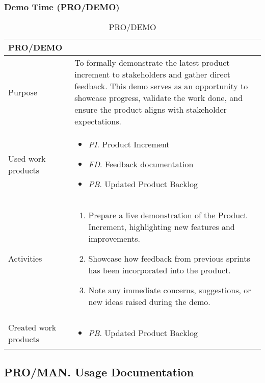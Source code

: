 \subsubsection{Demo Time (PRO/DEMO)}
\begin{table}[h!]
\begin{tabular}{l|p{}}
\hline
\textbf{PRO/DEMO}        & \textbf{} \\ \hline
Purpose & To formally demonstrate the latest product increment to stakeholders and gather direct feedback. This demo serves as an opportunity to showcase progress, validate the work done, and ensure the product aligns with stakeholder expectations. \\ \hline
Used work products    &      
\begin{itemize}
    \item \textit{PI}. Product Increment
    \item \textit{FD}. Feedback documentation
    \item \textit{PB}. Updated Product Backlog
\end{itemize}
\\ \hline
Activities            &   
\begin{enumerate}
    \item Prepare a live demonstration of the Product Increment, highlighting new features and improvements.
    \item Showcase how feedback from previous sprints has been incorporated into the product.
    \item Note any immediate concerns, suggestions, or new ideas raised during the demo.
\end{enumerate}
\\ \hline
Created work products &     
\begin{itemize}
    \item \textit{PB}. Updated Product Backlog
\end{itemize}
\end{tabular}
\caption{PRO/DEMO}
\label{demo_time_process}
\end{table}


\newpage

\subsection{PRO/MAN. Usage Documentation}


